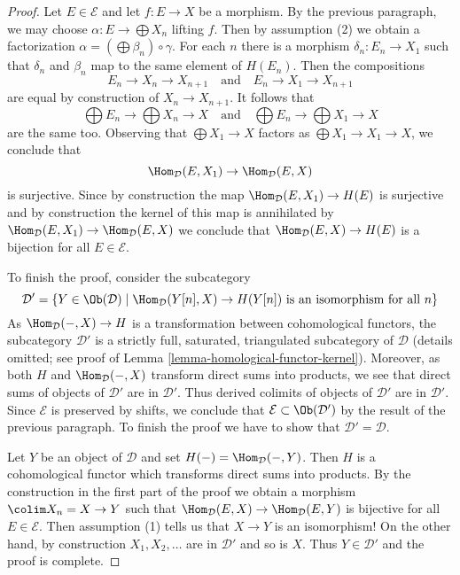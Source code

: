 \begin{proof}
\medskip\noindent
Let $E \in \mathcal{E}$ and let $f : E \to X$ be a morphism.
By the previous paragraph, we may choose $\alpha : E \to \bigoplus X_n$
lifting $f$. Then by assumption (2) we obtain a factorization
$\alpha = (\bigoplus \beta_n) \circ \gamma$.
For each $n$ there is a morphism $\delta_n : E_n \to X_1$ such that
$\delta_n$ and $\beta_n$ map to the same element of $H(E_n)$. Then
the compositions
$$
E_n \to X_n \to X_{n + 1}
\quad\text{and}\quad
E_n \to X_1 \to X_{n + 1}
$$
are equal by construction of $X_n \to X_{n + 1}$. It follows that
$$
\bigoplus E_n \to \bigoplus X_n \to X
\quad\text{and}\quad
\bigoplus E_n \to \bigoplus X_1 \to X
$$
are the same too. Observing that $\bigoplus X_1 \to X$ factors
as $\bigoplus X_1 \to X_1 \to X$, we conclude that
$$
\Hom_\mathcal{D}(E, X_1) \to \Hom_\mathcal{D}(E, X)
$$
is surjective. Since by construction the map
$\Hom_\mathcal{D}(E, X_1) \to H(E)$ is surjective and by
construction the kernel of this map is annihilated by
$\Hom_\mathcal{D}(E, X_1) \to \Hom_\mathcal{D}(E, X)$
we conclude that $\Hom_\mathcal{D}(E, X) \to H(E)$ is
a bijection for all $E \in \mathcal{E}$.

\medskip\noindent
To finish the proof, consider the subcategory
$$
\mathcal{D}' =
\{Y \in \Ob(\mathcal{D}) \mid \Hom_\mathcal{D}(Y[n], X) \to H(Y[n])
\text{ is an isomorphism for all }n\}
$$
As $\Hom_\mathcal{D}(-, X) \to H$ is a transformation between
cohomological functors,
the subcategory $\mathcal{D}'$ is a strictly full, saturated, triangulated
subcategory of $\mathcal{D}$ (details omitted; see proof of
Lemma \ref{lemma-homological-functor-kernel}). Moreover, as both
$H$ and $\Hom_\mathcal{D}(-, X)$ transform direct sums into products,
we see that direct sums of objects of $\mathcal{D}'$ are in $\mathcal{D}'$.
Thus derived colimits of objects of $\mathcal{D}'$ are in $\mathcal{D}'$.
Since $\mathcal{E}$ is preserved by shifts, we conclude that
$\mathcal{E} \subset \Ob(\mathcal{D}')$ by the result of the
previous paragraph. To finish the proof we have to show that
$\mathcal{D}' = \mathcal{D}$.

\medskip\noindent
Let $Y$ be an object of $\mathcal{D}$ and set $H(-) = \Hom_\mathcal{D}(-, Y)$.
Then $H$ is a cohomological functor which transforms direct sums into products.
By the construction in the first part of the proof we obtain a morphism
$\colim X_n = X \to Y$ such that
$\Hom_\mathcal{D}(E, X) \to \Hom_\mathcal{D}(E, Y)$ is bijective for all
$E \in \mathcal{E}$. Then assumption (1) tells us that $X \to Y$ is an
isomorphism! On the other hand, by construction $X_1, X_2, \ldots$
are in $\mathcal{D}'$ and so is $X$. Thus $Y \in \mathcal{D}'$ and
the proof is complete.
\end{proof}

